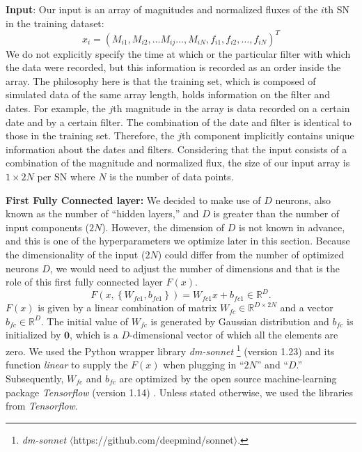 \documentclass[useamsfonts]{pasj01}
\begin{document}
%


{\bf Input}: Our input is an array of magnitudes and normalized fluxes of the $i$th SN in the training dataset:
\begin{equation}
      x_i = \left( M_{i1}, M_{i2}, \ldots M_{ij} \ldots , M_{iN}, f_{i1}, f_{i2}, \ldots, f_{iN} \right)^T
\end{equation}
We do not explicitly specify the time at which or the particular filter with which the data were recorded, but this information is recorded as an order inside the array. 
The philosophy here is that the training set, which is composed of simulated data of the same array length, holds information on the filter and dates. 
For example, the $j$th magnitude in the array is data recorded on a certain date and by a certain filter. 
The combination of the date and filter is identical to those in the training set. Therefore, the $j$th component implicitly contains unique information about the dates and filters.   
Considering that the input consists of a combination of the magnitude and normalized flux, the size of our input array is $1\times2N$ per SN where $N$ is the number of data points.


{\bf First Fully Connected layer:}
We decided to make use of $D$ neurons, also known as the number of ``hidden layers,'' and $D$ is greater than the number of input components ($2N$). However, the dimension of $D$ is not known in advance, and this is one of the hyperparameters we optimize later in this section. Because the dimensionality of the input ($2N$) could differ from the number of optimized neurons $D$, we would need to adjust the number of dimensions and that is the role of this first fully connected layer $F(x)$.
\begin{equation}
    F \left(x, \left\{W_{fc1},b_{fc1}\right\}\right) = W_{fc1} x + b_{fc1} \in \mathbb{R}^D.
\end{equation}
$F(x)$ is given by a linear combination of matrix $W_{fc} \in \mathbb{R}^{D\times 2N}$ and a vector $b_{fc} \in \mathbb{R}^D$. The initial value of $W_{fc}$ is generated by Gaussian distribution and $b_{fc}$ is initialized by $\mathbf{0}$, which is a $D$-dimensional vector of which all the elements are zero. We used the Python wrapper library {\it dm-sonnet} \footnote{{\it dm-sonnet} $\langle$https://github.com/deepmind/sonnet$\rangle$.} (version 1.23) and its function {\it linear} to supply the $F(x)$ when plugging in ``$2N$'' and ``$D$.''  
Subsequently, $W_{fc}$ and $b_{fc}$ are optimized by the open source machine-learning package {\it Tensorflow} (version 1.14) \citep{Abadi2016}.  
Unless stated otherwise, we used the libraries from {\it Tensorflow}.
\end{document}
